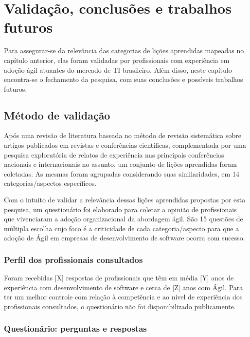 \chapter{Validação, conclusões e trabalhos futuros}

Para assegurar-se da relevância das categorias de lições aprendidas mapeadas no capítulo anterior, elas foram validadas por profissionais com experiência em adoção ágil atuantes do mercado de TI brasileiro. Além disso, neste capítulo encontra-se o fechamento da pesquisa, com suas conclusões e possíveis trabalhos futuros.

\section{Método de validação}

Após uma revisão de literatura baseada no método de revisão sistemática sobre artigos publicados em revistas e conferências científicas, complementada por  uma pesquisa exploratória de relatos de experiência nas principais conferências nacionais e internacionais no assunto, um conjunto de lições aprendidas foram coletadas. As mesmas foram agrupadas considerando suas similaridades, em 14 categorias/aspectos específicos.

Com o intuito de validar a relevância dessas lições aprendidas propostas por esta pesquisa, um questionário foi elaborado para coletar a opinião de profissionais que vivenciaram a adoção organizacional da abordagem ágil. São 15 questões de múltipla escolha cujo foco é a criticidade de cada categoria/aspecto para que a adoção de Ágil em empresas de desenvolvimento de software ocorra com sucesso.

\subsection{Perfil dos profissionais consultados}

Foram recebidas [X] respostas de profissionais que têm em média [Y] anos de experiência com desenvolvimento de software e cerca de [Z] anos com Ágil. Para ter um melhor controle com relação à competência e ao nível de experiência dos profissionais consultados, o questionário não foi disponibilizado publicamente.

\subsection{Questionário: perguntas e respostas}

